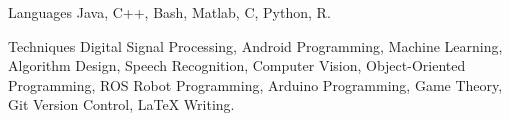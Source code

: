 

\begin{cvskills}
\cvskill
{Languages} %
{Java, C++, Bash, Matlab, C, Python, R.} %

\vspace{.1in}
\cvskill
{Techniques} %
{Digital Signal Processing, Android Programming, Machine Learning, Algorithm Design, Speech Recognition, Computer Vision, Object-Oriented Programming, ROS Robot Programming, Arduino Programming, Game Theory, Git Version Control, LaTeX Writing.} %



\end{cvskills}
